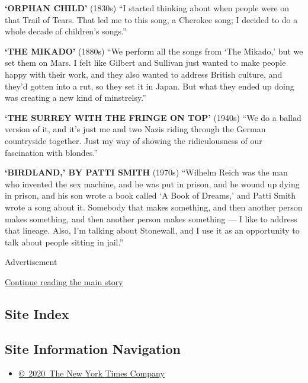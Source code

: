 \textbf{`ORPHAN CHILD'} (1830s) ``I started thinking about when people
were on that Trail of Tears. That led me to this song, a Cherokee song;
I decided to do a whole decade of children's songs.''

\textbf{`THE MIKADO'} (1880s) ``We perform all the songs from `The
Mikado,' but we set them on Mars. I felt like Gilbert and Sullivan just
wanted to make people happy with their work, and they also wanted to
address British culture, and they'd gotten into a rut, so they set it in
Japan. But what they ended up doing was creating a new kind of
minstrelsy.''

\textbf{`THE SURREY WITH THE FRINGE ON TOP'} (1940s) ``We do a ballad
version of it, and it's just me and two Nazis riding through the German
countryside together. Just my way of showing the ridiculousness of our
fascination with blondes.''

\textbf{`BIRDLAND,' BY PATTI SMITH} (1970s) ``Wilhelm Reich was the man
who invented the sex machine, and he was put in prison, and he wound up
dying in prison, and his son wrote a book called `A Book of Dreams,' and
Patti Smith wrote a song about it. Somebody that makes something, and
then another person makes something, and then another person makes
something --- I like to address that lineage. Also, I'm talking about
Stonewall, and I use it as an opportunity to talk about people sitting
in jail.''

Advertisement

\protect\hyperlink{after-bottom}{Continue reading the main story}

\hypertarget{site-index}{%
\subsection{Site Index}\label{site-index}}

\hypertarget{site-information-navigation}{%
\subsection{Site Information
Navigation}\label{site-information-navigation}}

\begin{itemize}
\tightlist
\item
  \href{https://help.nytimes3xbfgragh.onion/hc/en-us/articles/115014792127-Copyright-notice}{©~2020~The
  New York Times Company}
\end{itemize}

